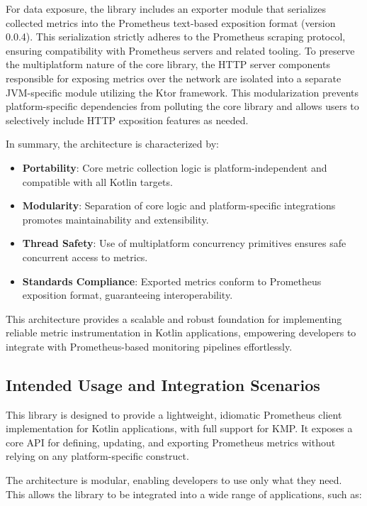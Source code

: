 For data exposure, the library includes an exporter module that serializes collected metrics into the Prometheus
text-based exposition format (version 0.0.4)\cite{prometheus_exposition_formats}.
This serialization strictly adheres to the Prometheus scraping protocol, ensuring compatibility with Prometheus servers and related tooling.
To preserve the multiplatform nature of the core library, the HTTP server components responsible for exposing
metrics over the network are isolated into a separate \ac{JVM}-specific module utilizing the Ktor framework.
This modularization prevents platform-specific dependencies from polluting the core library and allows users to selectively include HTTP exposition features as needed.

In summary, the architecture is characterized by:

\begin{itemize}
    \item \textbf{Portability}: Core metric collection logic is platform-independent and compatible with all Kotlin targets.
    \item \textbf{Modularity}: Separation of core logic and platform-specific integrations promotes maintainability and extensibility.
    \item \textbf{Thread Safety}: Use of multiplatform concurrency primitives ensures safe concurrent access to metrics.
    \item \textbf{Standards Compliance}: Exported metrics conform to Prometheus exposition format, guaranteeing interoperability.
\end{itemize}

This architecture provides a scalable and robust foundation for implementing reliable metric instrumentation in Kotlin applications, empowering developers to integrate with Prometheus-based monitoring pipelines effortlessly.

\subsection{Intended Usage and Integration Scenarios}\label{subsec:intended-usage-and-integration-scenarios}

This library is designed to provide a lightweight, idiomatic Prometheus client implementation for Kotlin
applications, with full support for \ac{KMP}.
It exposes a core \ac{API} for defining, updating, and exporting Prometheus metrics without relying on any platform-specific construct.

The architecture is modular, enabling developers to use only what they need.
This allows the library to be integrated into a wide range of
applications, such as:

